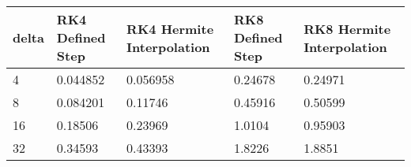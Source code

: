 \begin{tabular}{lllll}
delta & RK4 Defined Step & RK4 Hermite Interpolation & RK8 Defined Step & RK8 Hermite Interpolation \\ 
\hline 
4 & 0.044852 & 0.056958 & 0.24678 & 0.24971 \\ 
8 & 0.084201 & 0.11746 & 0.45916 & 0.50599 \\ 
16 & 0.18506 & 0.23969 & 1.0104 & 0.95903 \\ 
32 & 0.34593 & 0.43393 & 1.8226 & 1.8851 \\ 
\hline 
\end{tabular}
